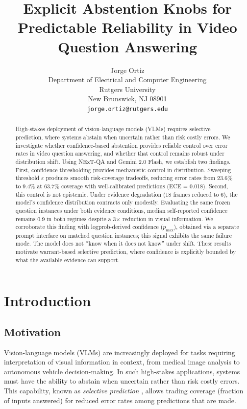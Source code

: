 \documentclass{article}
\title{Explicit Abstention Knobs for Predictable Reliability in Video Question Answering}
\author{
  Jorge Ortiz \\
  Department of Electrical and Computer Engineering\\
  Rutgers University\\
  New Brunswick, NJ 08901 \\
  \texttt{jorge.ortiz@rutgers.edu}
}
\begin{document}
\maketitle

\begin{abstract}
High-stakes deployment of vision-language models (VLMs) requires selective prediction, where systems abstain when uncertain rather than risk costly errors. We investigate whether confidence-based abstention provides reliable control over error rates in video question answering, and whether that control remains robust under distribution shift. Using NExT-QA and Gemini 2.0 Flash, we establish two findings. First, confidence thresholding provides mechanistic control in-distribution. Sweeping threshold $\varepsilon$ produces smooth risk-coverage tradeoffs, reducing error rates from 23.6\% to 9.4\% at 63.7\% coverage with well-calibrated predictions (ECE = 0.018). Second, this control is not epistemic. Under evidence degradation (18 frames reduced to 6), the model's confidence distribution contracts only modestly. Evaluating the same frozen question instances under both evidence conditions, median self-reported confidence remains 0.9 in both regimes despite a 3$\times$ reduction in visual information. We corroborate this finding with logprob-derived confidence ($p_{\max}$), obtained via a separate prompt interface on matched question instances; this signal exhibits the same failure mode. The model does not ``know when it does not know'' under shift. These results motivate warrant-based selective prediction, where confidence is explicitly bounded by what the available evidence can support.
\end{abstract}

\section{Introduction}

\subsection{Motivation}

Vision-language models (VLMs) are increasingly deployed for tasks requiring interpretation of visual information in context, from medical image analysis to autonomous vehicle decision-making. In such high-stakes applications, systems must have the ability to abstain when uncertain rather than risk costly errors. This capability, known as \emph{selective prediction} \citep{geifman2017selective,el2010foundations}, allows trading coverage (fraction of inputs answered) for reduced error rates among predictions that are made.
\end{document}
